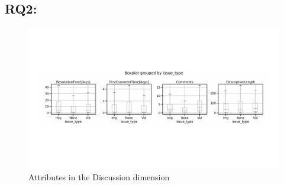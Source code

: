\subsection*{RQ2: \RQtwo{}}
\begin{figure}[t]
    \centering
    \includegraphics[width=1\linewidth]{./figures/discussions.pdf}
    \caption{Attributes in the Discussion dimension}
    \label{fig:discussion}
\end{figure}

